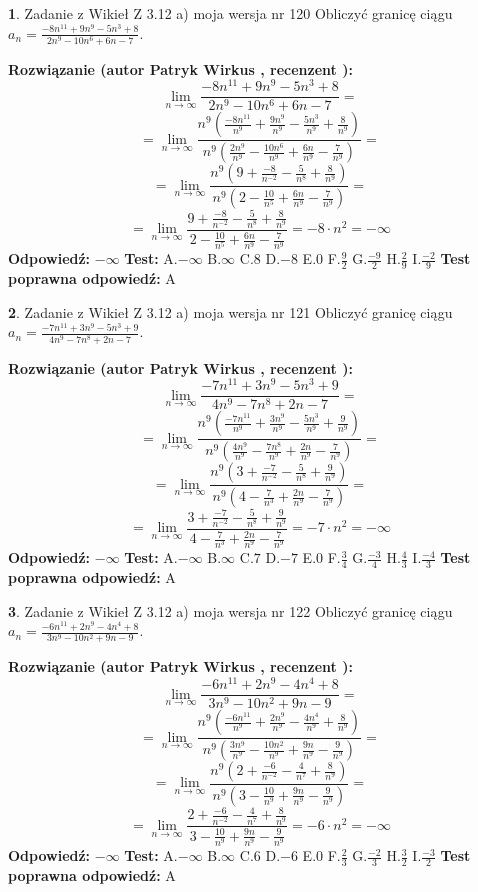 \documentclass[12pt, a4paper]{article}
\theoremstyle{definition} %
\newtheorem{zad}{}
\newcommand{\zadStart}[1]{\begin{zad}#1\newline}
\newcommand{\zadStop}{\end{zad}}
\newcommand{\rozwStart}[2]{\noindent \textbf{Rozwiązanie (autor #1 , recenzent #2): }\newline}
\newcommand{\rozwStop}{\newline}
\newcommand{\odpStart}{\noindent \textbf{Odpowiedź:}\newline}
\newcommand{\odpStop}{\newline}
\newcommand{\testStart}{\noindent \textbf{Test:}\newline}
\newcommand{\testStop}{\newline}
\newcommand{\kluczStart}{\noindent \textbf{Test poprawna odpowiedź:}\newline}
\newcommand{\kluczStop}{\newline}
\begin{document}
\zadStart{Zadanie z Wikieł Z 3.12 a) moja wersja nr 120}
Obliczyć granicę ciągu $a_{n}=\frac{-8n^{11}+9n^{9}-5n^{3}+8}{2n^{9}-10n^{6}+6n-7}$.
\zadStop
\rozwStart{Patryk Wirkus}{}
$$\lim\limits_{n\to\infty}\frac{-8n^{11}+9n^{9}-5n^{3}+8}{2n^{9}-10n^{6}+6n-7}=$$
$$=\lim\limits_{n\to\infty}\frac{n^{9}\left(\frac{-8n^{11}}{n^{9}}+\frac{9n^{9}}{n^{9}}-\frac{5n^{3}}{n^{9}}+\frac{8}{n^{9}}\right)}{n^{9}\left(\frac{2n^{9}}{n^{9}}-\frac{10n^{6}}{n^{9}}+\frac{6n}{n^{9}}-\frac{7}{n^{9}}\right)}=$$
$$=\lim\limits_{n\to\infty}\frac{n^{9}\left(9+\frac{-8}{n^{-2}}-\frac{5}{n^{8}}+\frac{8}{n^{9}}\right)}
{n^{9}\left(2-\frac{10}{n^{5}}+\frac{6n}{n^{9}}-\frac{7}{n^{9}}\right)}=$$
$$=\lim\limits_{n\to\infty}\frac{9+\frac{-8}{n^{-2}}-\frac{5}{n^{8}}+\frac{8}{n^{9}}}{2-\frac{10}{n^{5}}+\frac{6n}{n^{9}}-\frac{7}{n^{9}}}=-8\cdot n^{2} = -\infty$$
\rozwStop
\odpStart
$-\infty$
\odpStop
\testStart
A.$-\infty$
B.$\infty$
C.$8$
D.$-8$
E.$0$
F.$\frac{9}{2}$
G.$\frac{-9}{2}$
H.$\frac{2}{9}$
I.$\frac{-2}{9}$
\testStop
\kluczStart
A
\kluczStop



\zadStart{Zadanie z Wikieł Z 3.12 a) moja wersja nr 121}
Obliczyć granicę ciągu $a_{n}=\frac{-7n^{11}+3n^{9}-5n^{3}+9}{4n^{9}-7n^{8}+2n-7}$.
\zadStop
\rozwStart{Patryk Wirkus}{}
$$\lim\limits_{n\to\infty}\frac{-7n^{11}+3n^{9}-5n^{3}+9}{4n^{9}-7n^{8}+2n-7}=$$
$$=\lim\limits_{n\to\infty}\frac{n^{9}\left(\frac{-7n^{11}}{n^{9}}+\frac{3n^{9}}{n^{9}}-\frac{5n^{3}}{n^{9}}+\frac{9}{n^{9}}\right)}{n^{9}\left(\frac{4n^{9}}{n^{9}}-\frac{7n^{8}}{n^{9}}+\frac{2n}{n^{9}}-\frac{7}{n^{9}}\right)}=$$
$$=\lim\limits_{n\to\infty}\frac{n^{9}\left(3+\frac{-7}{n^{-2}}-\frac{5}{n^{8}}+\frac{9}{n^{9}}\right)}
{n^{9}\left(4-\frac{7}{n^{3}}+\frac{2n}{n^{9}}-\frac{7}{n^{9}}\right)}=$$
$$=\lim\limits_{n\to\infty}\frac{3+\frac{-7}{n^{-2}}-\frac{5}{n^{8}}+\frac{9}{n^{9}}}{4-\frac{7}{n^{3}}+\frac{2n}{n^{9}}-\frac{7}{n^{9}}}=-7\cdot n^{2} = -\infty$$
\rozwStop
\odpStart
$-\infty$
\odpStop
\testStart
A.$-\infty$
B.$\infty$
C.$7$
D.$-7$
E.$0$
F.$\frac{3}{4}$
G.$\frac{-3}{4}$
H.$\frac{4}{3}$
I.$\frac{-4}{3}$
\testStop
\kluczStart
A
\kluczStop



\zadStart{Zadanie z Wikieł Z 3.12 a) moja wersja nr 122}
Obliczyć granicę ciągu $a_{n}=\frac{-6n^{11}+2n^{9}-4n^{4}+8}{3n^{9}-10n^{2}+9n-9}$.
\zadStop
\rozwStart{Patryk Wirkus}{}
$$\lim\limits_{n\to\infty}\frac{-6n^{11}+2n^{9}-4n^{4}+8}{3n^{9}-10n^{2}+9n-9}=$$
$$=\lim\limits_{n\to\infty}\frac{n^{9}\left(\frac{-6n^{11}}{n^{9}}+\frac{2n^{9}}{n^{9}}-\frac{4n^{4}}{n^{9}}+\frac{8}{n^{9}}\right)}{n^{9}\left(\frac{3n^{9}}{n^{9}}-\frac{10n^{2}}{n^{9}}+\frac{9n}{n^{9}}-\frac{9}{n^{9}}\right)}=$$
$$=\lim\limits_{n\to\infty}\frac{n^{9}\left(2+\frac{-6}{n^{-2}}-\frac{4}{n^{7}}+\frac{8}{n^{9}}\right)}
{n^{9}\left(3-\frac{10}{n^{9}}+\frac{9n}{n^{9}}-\frac{9}{n^{9}}\right)}=$$
$$=\lim\limits_{n\to\infty}\frac{2+\frac{-6}{n^{-2}}-\frac{4}{n^{7}}+\frac{8}{n^{9}}}{3-\frac{10}{n^{9}}+\frac{9n}{n^{9}}-\frac{9}{n^{9}}}=-6\cdot n^{2} = -\infty$$
\rozwStop
\odpStart
$-\infty$
\odpStop
\testStart
A.$-\infty$
B.$\infty$
C.$6$
D.$-6$
E.$0$
F.$\frac{2}{3}$
G.$\frac{-2}{3}$
H.$\frac{3}{2}$
I.$\frac{-3}{2}$
\testStop
\kluczStart
A
\kluczStop
\end{document}
